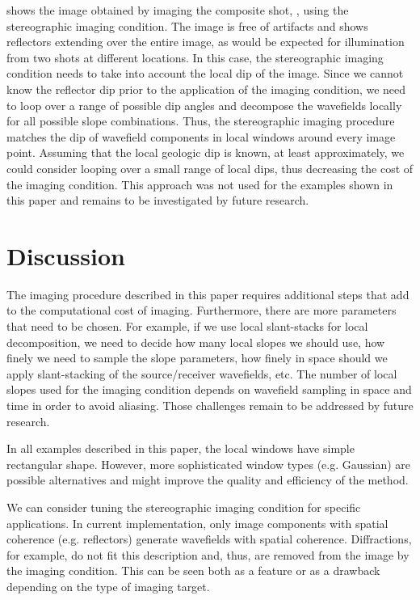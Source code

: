  shows the image obtained by imaging the
composite shot, , using the stereographic imaging
condition. The image is free of artifacts and shows reflectors
extending over the entire image, as would be expected for illumination
from two shots at different locations. In this case, the stereographic
imaging condition needs to take into account the local dip of the
image. Since we cannot know the reflector dip prior to the
application of the imaging condition, we need to loop over a range of
possible dip angles and decompose the wavefields locally for all
possible slope combinations.
Thus, the stereographic imaging procedure matches the dip of wavefield
components in local windows around every image point. Assuming that
the local geologic dip is known, at least approximately, we could
consider looping over a small range of local dips, thus decreasing the
cost of the imaging condition. This approach was not used for the
examples shown in this paper and remains to be investigated by future
research.

\section{Discussion}

The imaging procedure described in this paper requires additional
steps that add to the computational cost of imaging. Furthermore,
there are more parameters that need to be chosen. For example, if we
use local slant-stacks for local decomposition, we need to decide how
many local slopes we should use, how finely we need to sample the
slope parameters, how finely in space should we apply slant-stacking
of the source/receiver wavefields, etc. The number of local slopes
used for the imaging condition depends on wavefield sampling in space
and time in order to avoid aliasing. Those challenges remain to be
addressed by future research.

In all examples described in this paper, the local windows have simple
rectangular shape. However, more sophisticated window types
(e.g. Gaussian) are possible alternatives and might improve the
quality and efficiency of the method.

We can consider tuning the stereographic imaging condition for
specific applications. In current implementation, only image
components with spatial coherence (e.g. reflectors) generate
wavefields with spatial coherence. Diffractions, for example, do not
fit this description and, thus, are removed from the image by the
imaging condition. This can be seen both as a feature or as a drawback
depending on the type of imaging target.

